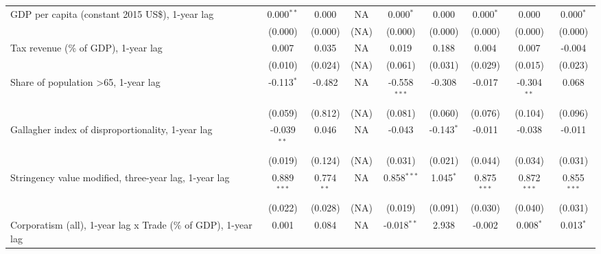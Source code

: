 \begin{table}[htbp]
\begin{tabular}{lcccccccc}
      GDP per capita (constant 2015 US\$), 1-year lag                & 0.000$^{**}$  & 0.000                     & NA           & 0.000$^{*}$    & 0.000            & 0.000$^{*}$     & 0.000           & 0.000$^{*}$\\   
                                                                     & (0.000)       & (0.000)                   & (NA)         & (0.000)        & (0.000)          & (0.000)         & (0.000)         & (0.000)\\   
      Tax revenue (\% of GDP), 1-year lag                            & 0.007         & 0.035                     & NA           & 0.019          & 0.188            & 0.004           & 0.007           & -0.004\\   
                                                                     & (0.010)       & (0.024)                   & (NA)         & (0.061)        & (0.031)          & (0.029)         & (0.015)         & (0.023)\\   
      Share of population >65, 1-year lag                            & -0.113$^{*}$  & -0.482                    & NA           & -0.558$^{***}$ & -0.308           & -0.017          & -0.304$^{**}$   & 0.068\\   
                                                                     & (0.059)       & (0.812)                   & (NA)         & (0.081)        & (0.060)          & (0.076)         & (0.104)         & (0.096)\\   
      Gallagher index of disproportionality, 1-year lag              & -0.039$^{**}$ & 0.046                     & NA           & -0.043         & -0.143$^{*}$     & -0.011          & -0.038          & -0.011\\   
                                                                     & (0.019)       & (0.124)                   & (NA)         & (0.031)        & (0.021)          & (0.044)         & (0.034)         & (0.031)\\   
      Stringency value modified, three-year lag, 1-year lag          & 0.889$^{***}$ & 0.774$^{**}$              & NA           & 0.858$^{***}$  & 1.045$^{*}$      & 0.875$^{***}$   & 0.872$^{***}$   & 0.855$^{***}$\\   
                                                                     & (0.022)       & (0.028)                   & (NA)         & (0.019)        & (0.091)          & (0.030)         & (0.040)         & (0.031)\\   
      Corporatism (all), 1-year lag x Trade (\% of GDP), 1-year lag  & 0.001         & 0.084                     & NA           & -0.018$^{**}$  & 2.938            & -0.002          & 0.008$^{*}$     & 0.013$^{*}$\\   

\end{tabular}
\end{table}
